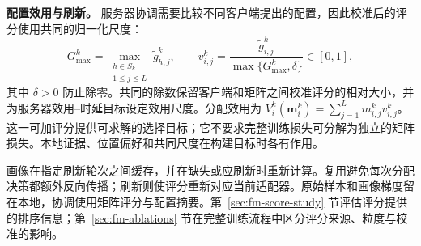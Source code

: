 \noindent\textbf{配置效用与刷新。}
服务器协调需要比较不同客户端提出的配置，因此校准后的评分使用共同的归一化尺度：
\begin{equation}
 G_{\max}^k=\max_{\substack{h\in S_k\\1\le j\le L}}\widetilde g_{h,j}^k,
 \qquad v_{i,j}^k=
 \frac{\widetilde g_{i,j}^k}{\max\{G_{\max}^k,\delta\}}\in[0,1],
 \label{eq:normalization}
\end{equation}
其中 $\delta>0$ 防止除零。共同的除数保留客户端和矩阵之间校准评分的相对大小，并为服务器效用--时延目标设定效用尺度。分配效用为
$V_i^k(\mathbf m_i^k)=\sum_{j=1}^{L}m_{i,j}^kv_{i,j}^k$。
这一可加评分提供可求解的选择目标；它不要求完整训练损失可分解为独立的矩阵损失。本地证据、位置偏好和共同尺度在构建目标时各有作用。

画像在指定刷新轮次之间缓存，并在缺失或应刷新时重新计算。复用避免每次分配决策都额外反向传播；刷新则使评分重新对应当前适配器。原始样本和画像梯度留在本地，协调使用矩阵评分与配置摘要。第~\ref{sec:fm-score-study} 节评估评分提供的排序信息；第~\ref{sec:fm-ablations} 节在完整训练流程中区分评分来源、粒度与校准的影响。
